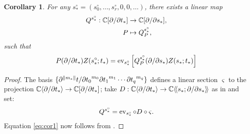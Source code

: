 \documentclass[11pt,twoside]{article}
\theoremstyle{plain}
\newtheorem{corollary}{Corollary}
\theoremstyle{remark}
\theoremstyle{definition}
\numberwithin{equation}{section} %
\begin{document}
\begin{corollary}\label{cor:dfiz+der}
  For any $s^\circ_* = (s^\circ_0, \dots, s^\circ_r, 0, 0, \dots)$,
  there exists a linear map
  \begin{equation}
    \label{eq:dfn-Q}
    \begin{split}
      Q^{s^\circ_*} : \setC[\del / \del t_*]
      &\to \setC [\del / \del s_*],
      \\
      P &\mapsto Q^{s^\circ_*}_P,
    \end{split}
  \end{equation}
  such that
  \begin{equation}
    \label{eq:cor1}
    P (\del / \del t_*)Z(s_*^\circ;t_*) = \ev_{s^\circ_*} \left[ 
      Q^{s^\circ_*}_P(\del /\del s_*) Z(s_*;t_*) 
    \right]
\end{equation}
\end{corollary}
\begin{proof}
  The basis $\{ \del^{\abs{m_*}} t / {\del t_0}^{m_0} {\del t_1}^{m_1}
  \cdots {\del t_q}^{m_q} \}$ defines a linear section $\varsigma$ to
  the projection $\mathbb{C} \langle \partial / \partial t_* \rangle \to \mathbb{C}[
  \partial / \partial t_*]$; take $D: \setC \langle \del / \del t_* \rangle
  \to \setC \langle\!\langle s_*; \del / \del s_* \rangle\!\rangle$ as
  in  and set:
  \begin{equation*}
    Q^{s^\circ_*} = \operatorname{ev}_{s^\circ_*} \circ D \circ \varsigma.
  \end{equation*}
  Equation \eqref{eq:cor1} now follows from .
\end{proof}
\end{document}
